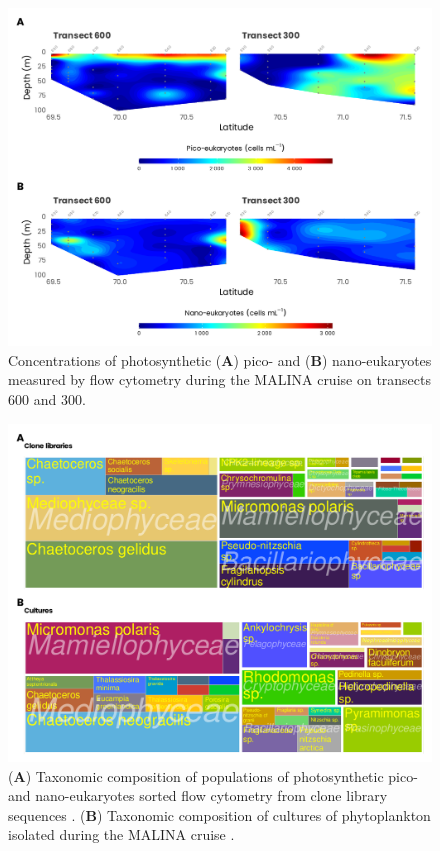 \documentclass[essd, manuscript]{copernicus}
\begin{document}
\clearpage

\begin{figure}[H]
	\centering
	\includegraphics[scale = 1]{../../../graphs/fig10.pdf}
	\caption{Concentrations of photosynthetic (\textbf{A}) pico- and (\textbf{B}) nano-eukaryotes measured by flow cytometry during the MALINA cruise on transects 600 and 300.}
\end{figure}

\clearpage

\begin{figure}[H]
	\centering
	\includegraphics[scale = 1]{../../../graphs/fig11.pdf}
	\caption{(\textbf{A}) Taxonomic composition of populations of photosynthetic pico- and nano-eukaryotes sorted flow cytometry from clone library sequences  \citep{Balzano2012a}. (\textbf{B}) Taxonomic composition of cultures of phytoplankton isolated during the MALINA cruise \citep{Balzano2012b}.}
\end{figure}
\end{document}
